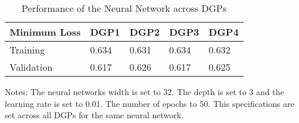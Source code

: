 

\begin{table}[]
\centering
\begin{threeparttable}
\caption{Performance of the Neural Network across DGPs}
\label{tab:table3}
\begin{tabular}{@{}lllll@{}}
\toprule
\hline
\addlinespace
Minimum Loss                & DGP1 & DGP2 & DGP3 & DGP4 \\ \midrule
Training    & 0.634 & 0.631 & 0.634 & 0.632 \\
Validation  & 0.617 & 0.626 & 0.617 & 0.625 \\ \bottomrule
\end{tabular}
\begin{tablenotes}
    \item Notes: The neural networks width is set to 32. The depth is set to 3 and the learning rate is set to 0.01. The number of epochs to 50. This specifications are set across all DGPs for the same neural network.
\end{tablenotes}
\end{threeparttable}
\end{table}
